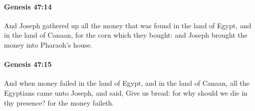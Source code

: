 		\paragraph{Genesis 47:14} %
			\label{GENESIS-47-14}

			And Joseph gathered up all the money that was found in the land of Egypt, and in the land of Canaan, for the corn which they bought: and Joseph brought the money into Pharaoh's house.


		\paragraph{Genesis 47:15} %
			\label{GENESIS-47-15}

			And when money failed in the land of Egypt, and in the land of Canaan, all the Egyptians came unto Joseph, and said, Give us bread: for why should we die in thy presence? for the money faileth.


